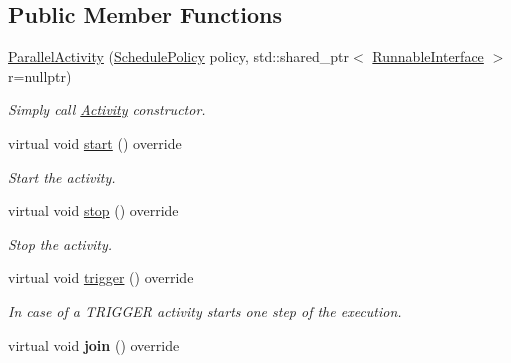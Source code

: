 \subsection*{Public Member Functions}
\begin{DoxyCompactItemize}
\item 
\hypertarget{classcoco_1_1_parallel_activity_ab3446f590315a0d5ba42fb84bff6641f}{}\hyperlink{classcoco_1_1_parallel_activity_ab3446f590315a0d5ba42fb84bff6641f}{Parallel\+Activity} (\hyperlink{structcoco_1_1_schedule_policy}{Schedule\+Policy} policy, std\+::shared\+\_\+ptr$<$ \hyperlink{classcoco_1_1_runnable_interface}{Runnable\+Interface} $>$ r=nullptr)\label{classcoco_1_1_parallel_activity_ab3446f590315a0d5ba42fb84bff6641f}

\begin{DoxyCompactList}\small\item\em Simply call \hyperlink{classcoco_1_1_activity}{Activity} constructor. \end{DoxyCompactList}\item 
\hypertarget{classcoco_1_1_parallel_activity_aa642be0f3fd844cfced97cabadd59dfe}{}virtual void \hyperlink{classcoco_1_1_parallel_activity_aa642be0f3fd844cfced97cabadd59dfe}{start} () override\label{classcoco_1_1_parallel_activity_aa642be0f3fd844cfced97cabadd59dfe}

\begin{DoxyCompactList}\small\item\em Start the activity. \end{DoxyCompactList}\item 
\hypertarget{classcoco_1_1_parallel_activity_a32e121790e325add143e5f9411ac75a4}{}virtual void \hyperlink{classcoco_1_1_parallel_activity_a32e121790e325add143e5f9411ac75a4}{stop} () override\label{classcoco_1_1_parallel_activity_a32e121790e325add143e5f9411ac75a4}

\begin{DoxyCompactList}\small\item\em Stop the activity. \end{DoxyCompactList}\item 
\hypertarget{classcoco_1_1_parallel_activity_a6d5004facadbbae85c5e98979dc1e301}{}virtual void \hyperlink{classcoco_1_1_parallel_activity_a6d5004facadbbae85c5e98979dc1e301}{trigger} () override\label{classcoco_1_1_parallel_activity_a6d5004facadbbae85c5e98979dc1e301}

\begin{DoxyCompactList}\small\item\em In case of a T\+R\+I\+G\+G\+E\+R activity starts one step of the execution. \end{DoxyCompactList}\item 
\hypertarget{classcoco_1_1_parallel_activity_a93c7a23c4a896e3fe33bfc630090969e}{}virtual void {\bfseries join} () override\label{classcoco_1_1_parallel_activity_a93c7a23c4a896e3fe33bfc630090969e}

\end{DoxyCompactItemize}
